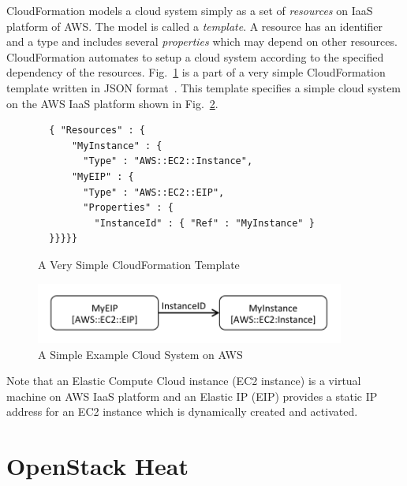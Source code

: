 \documentclass[12pt]{report}
\begin{document}
CloudFormation models a cloud system simply as a set of {\it
  resources} on IaaS platform of AWS. The model is called a {\it
  template}. A resource has an identifier and a type and includes
several {\it properties} which may depend on other
resources. CloudFormation automates to setup a cloud system according
to the specified dependency of the
resources. Fig.~\ref{fig:AWSExample} is a part of a very simple
CloudFormation template written in JSON format~\cite{JSON}.
This template specifies a simple cloud system on the AWS IaaS platform
shown in Fig.~\ref{fig:exampleaws}.
\begin{figure}
\small
\begin{verbatim}
  { "Resources" : {
      "MyInstance" : {
        "Type" : "AWS::EC2::Instance",
      "MyEIP" : {
        "Type" : "AWS::EC2::EIP",
        "Properties" : {
          "InstanceId" : { "Ref" : "MyInstance" }
  }}}}}
\end{verbatim}
\normalsize
\vspace{-0.6cm}
\caption{A Very Simple CloudFormation Template}
\label{fig:AWSExample}
\end{figure}
\begin{figure}
\centering
\includegraphics[height=2cm,natwidth=396,natheight=78]{./exaws.png}
\caption{A Simple Example Cloud System on AWS}
\label{fig:exampleaws}
\end{figure}
Note that an Elastic Compute Cloud instance (EC2 instance) is a
virtual machine on AWS IaaS platform and an Elastic IP (EIP)
provides a static IP address for an EC2 instance which is dynamically
created and activated.

\section{OpenStack Heat}
\label{sec:heat}
\end{document}
